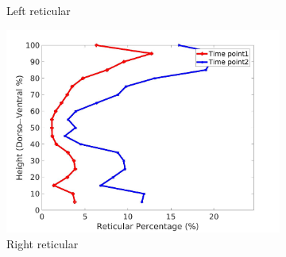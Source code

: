 \begin{figure}[H]
\begin{subfigure}{.42\linewidth}
  \caption{Left reticular}
  \label{fig:IPF13DiseaseDorsoToVentral-c} 
\end{subfigure} 
\begin{subfigure}{.42\linewidth}%
  \includegraphics[width=\linewidth,trim={{.0\wd0} {.0\wd0} {.0\wd0} {.0\wd0}},clip]{Appendix/Image_AppexA/DorsoToVentral/IPF13RightLungReticularDiseaseDorsoToVentral.jpg}
  \caption{Right reticular}
  \label{fig:IPF13DiseaseDorsoToVentral-d}
\end{subfigure}
\begin{subfigure}{.42\linewidth}%

\end{subfigure}
\end{figure}
